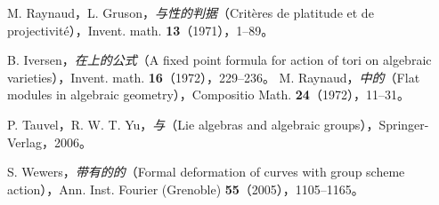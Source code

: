 \noindent [RG71] M. Raynaud，L. Gruson，\textit{与性的判据}（Critères de platitude et de projectivité），Invent. math. \textbf{13}（1971），1--89。

\noindent [Iv72] B. Iversen，\textit{在上的公式}（A fixed point formula for action of tori on algebraic varieties），Invent. math. \textbf{16}（1972），229--236。
\noindent [Ray72] M. Raynaud，\textit{中的}（Flat modules in algebraic geometry），Compositio Math. \textbf{24}（1972），11--31。

\noindent [TY06] P. Tauvel，R. W. T. Yu，\textit{与}（Lie algebras and algebraic groups），Springer-Verlag，2006。

\noindent [We05] S. Wewers，\textit{带有的的}（Formal deformation of curves with group scheme action），Ann. Inst. Fourier (Grenoble) \textbf{55}（2005），1105--1165。
